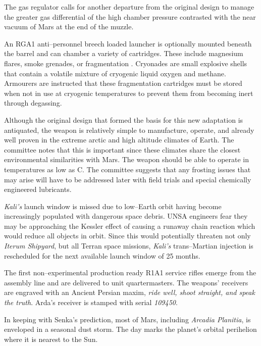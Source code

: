 The gas regulator calls for another departure from the original design to manage the greater gas differential of the high chamber pressure contrasted with the near vacuum of Mars at the end of the muzzle.

An RGA1 anti--personnel breech loaded launcher is optionally mounted beneath the barrel and can chamber a variety of cartridges. These include magnesium flares, smoke grenades, or fragmentation . Cryonades are small explosive shells that contain a volatile mixture of cryogenic liquid oxygen and methane. Armourers are instructed that these fragmentation cartridges must be stored when not in use at cryogenic temperatures to prevent them from becoming inert through degassing.

Although the original design that formed the basis for this new adaptation is antiquated, the weapon is relatively simple to manufacture, operate, and already well proven in the extreme arctic and high altitude climates of Earth. The committee notes that this is important since these climates share the closest environmental similarities with Mars. The weapon should be able to operate in temperatures as low as C. The committee suggests that any frosting issues that may arise will have to be addressed later with field trials and special chemically engineered lubricants.
\StopTimelineDate

{\it Kali's} launch window is missed due to low--Earth orbit having become increasingly populated with dangerous space debris. UNSA engineers fear they may be approaching the Kessler effect of causing a runaway chain reaction which would reduce all objects in orbit. Since this would potentially threaten not only {\it Iterum Shipyard}, but all Terran space missions, {\it Kali's} trans--Martian injection is rescheduled for the next available launch window of 25 months.
\StopTimelineDate

The first non--experimental production ready R1A1 service rifles emerge from the assembly line and are delivered to unit quartermasters. The weapons' receivers are engraved with an Ancient Persian maxim, {\it ride well, shoot straight, and speak the truth}. Arda's receiver is stamped with serial {\it 109450}.
\StopTimelineDate

In keeping with Senka's prediction, most of Mars, including {\it Arcadia Planitia}, is enveloped in a seasonal dust storm. The day marks the planet's orbital perihelion where it is nearest to the Sun.
\StopTimelineDate

